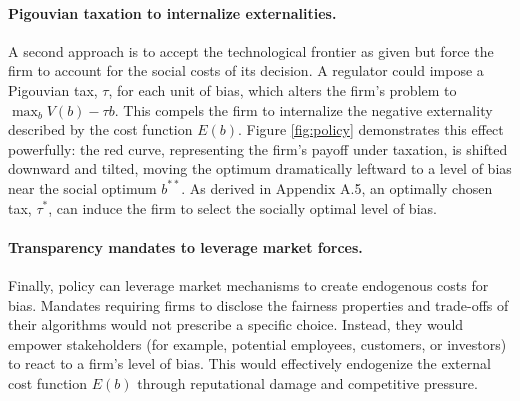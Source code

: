 \paragraph{Pigouvian taxation to internalize externalities.}
A second approach is to accept the technological frontier as given but force the firm to account for the social costs of its decision. A regulator could impose a Pigouvian tax, $\tau$, for each unit of bias, which alters the firm's problem to $\max_b V(b) - \tau b$. This compels the firm to internalize the negative externality described by the cost function $E(b)$. Figure \ref{fig:policy} demonstrates this effect powerfully: the red curve, representing the firm's payoff under taxation, is shifted downward and tilted, moving the optimum dramatically leftward to a level of bias near the social optimum $b^{**}$. As derived in Appendix A.5, an optimally chosen tax, $\tau^*$, can induce the firm to select the socially optimal level of bias.

\paragraph{Transparency mandates to leverage market forces.}
Finally, policy can leverage market mechanisms to create endogenous costs for bias. Mandates requiring firms to disclose the fairness properties and trade-offs of their algorithms would not prescribe a specific choice. Instead, they would empower stakeholders (for example, potential employees, customers, or investors) to react to a firm's level of bias. This would effectively endogenize the external cost function $E(b)$ through reputational damage and competitive pressure.

